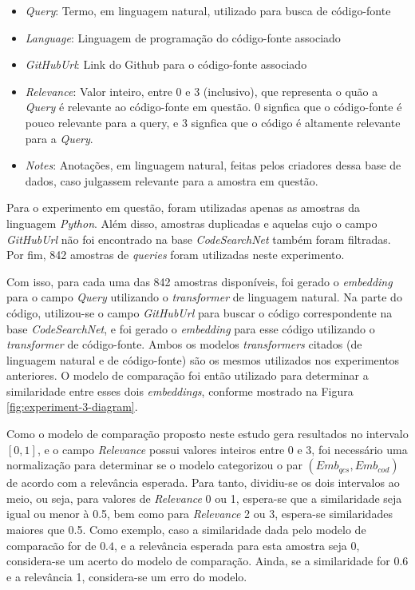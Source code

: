 \begin{itemize}
    \item \textit{Query}: Termo, em linguagem natural, utilizado para busca de código-fonte
    \item \textit{Language}: Linguagem de programação do código-fonte associado
    \item \textit{GitHubUrl}: Link do Github para o código-fonte associado
    \item \textit{Relevance}: Valor inteiro, entre 0 e 3 (inclusivo), que representa o quão a \textit{Query} é relevante ao código-fonte em questão. 0 signfica que o código-fonte é pouco relevante para a query, e 3 signfica que o código é altamente relevante para a \textit{Query}.
    \item \textit{Notes}: Anotações, em linguagem natural, feitas pelos criadores dessa base de dados, caso julgassem relevante para a amostra em questão.
\end{itemize}

Para o experimento em questão, foram utilizadas apenas as amostras da linguagem \textit{Python}. Além disso, amostras duplicadas e aquelas cujo o campo \textit{GitHubUrl} não foi encontrado na base \textit{CodeSearchNet} também foram filtradas. Por fim, 842 amostras de \textit{queries} foram utilizadas neste experimento.

Com isso, para cada uma das 842 amostras disponíveis, foi gerado o \textit{embedding} para o campo \textit{Query} utilizando o \textit{transformer} de linguagem natural. Na parte do código, utilizou-se o campo \textit{GitHubUrl} para buscar o código correspondente na base \textit{CodeSearchNet}, e foi gerado o \textit{embedding} para esse código utilizando o \textit{transformer} de código-fonte. Ambos os modelos \textit{transformers} citados (de linguagem natural e de código-fonte) são os mesmos utilizados nos experimentos anteriores. O modelo de comparação foi então utilizado para determinar a similaridade entre esses dois \textit{embeddings}, conforme mostrado na Figura \ref{fig:experiment-3-diagram}.

Como o modelo de comparação proposto neste estudo gera resultados no intervalo $[0, 1]$, e o campo \textit{Relevance} possui valores inteiros entre 0 e 3, foi necessário uma normalização para determinar se o modelo categorizou o par $(Emb_{qcs}, Emb_{cod})$ de acordo com a relevância esperada. Para tanto, dividiu-se os dois intervalos ao meio, ou seja, para valores de \textit{Relevance} 0 ou 1, espera-se que a similaridade seja igual ou menor à 0.5, bem como para \textit{Relevance} 2 ou 3, espera-se similaridades maiores que 0.5. Como exemplo, caso a similaridade dada pelo modelo de comparacão for de $0.4$, e a relevância esperada para esta amostra seja 0, considera-se um acerto do modelo de comparação. Ainda, se a similaridade for $0.6$ e a relevância 1, considera-se um erro do modelo.


